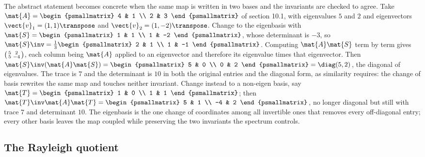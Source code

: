 \begin{example}
The abstract statement becomes concrete when the same map is written in
two bases and the invariants are checked to agree. Take $\mat{A} =
\begin{psmallmatrix} 4 & 1 \\ 2 & 3 \end{psmallmatrix}$ of section 10.1,
with eigenvalues $5$ and $2$ and eigenvectors $\vect{v}_{1} = (1,1)
\transpose$ and $\vect{v}_{2} = (1,-2)\transpose$. Change to the
eigenbasis with $\mat{S} = \begin{psmallmatrix} 1 & 1 \\ 1 & -2
\end{psmallmatrix}$, whose determinant is $-3$, so $\mat{S}\inv =
\tfrac{1}{3}\begin{psmallmatrix} 2 & 1 \\ 1 & -1 \end{psmallmatrix}$.
Computing $\mat{A}\mat{S}$ term by term gives $\begin{psmallmatrix} 5 &
2 \\ 5 & -4 \end{psmallmatrix}$, each column being $\mat{A}$ applied to
an eigenvector and therefore its eigenvalue times that eigenvector.
Then $\mat{S}\inv(\mat{A}\mat{S}) = \begin{psmallmatrix} 5 & 0 \\ 0 & 2
\end{psmallmatrix} = \diag(5, 2)$, the diagonal of eigenvalues. The
trace is $7$ and the determinant is $10$ in both the original entries
and the diagonal form, as similarity requires: the change of basis
rewrites the same map and touches neither invariant. Change instead to
a non-eigen basis, say $\mat{T} = \begin{psmallmatrix} 1 & 0 \\ 1 & 1
\end{psmallmatrix}$; then $\mat{T}\inv\mat{A}\mat{T} =
\begin{psmallmatrix} 5 & 1 \\ -4 & 2 \end{psmallmatrix}$, no longer
diagonal but still with trace $7$ and determinant $10$. The eigenbasis
is the one change of coordinates among all invertible ones that removes
every off-diagonal entry; every other basis leaves the map coupled
while preserving the two invariants the spectrum controls.
\end{example}

\subsection{The Rayleigh quotient}

